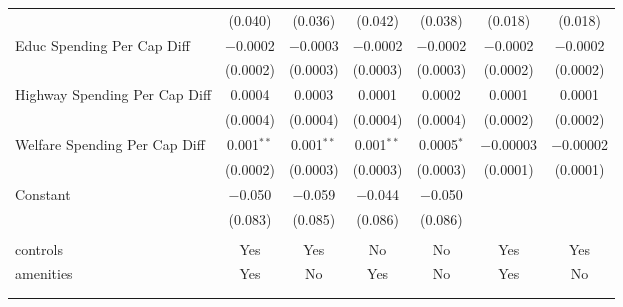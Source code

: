 \begin{table}[!htbp]
\begin{tabular}{@{\extracolsep{5pt}}lcccccc}
  & (0.040) & (0.036) & (0.042) & (0.038) & (0.018) & (0.018) \\ 
  Educ Spending Per Cap Diff & $-$0.0002 & $-$0.0003 & $-$0.0002 & $-$0.0002 & $-$0.0002 & $-$0.0002 \\ 
  & (0.0002) & (0.0003) & (0.0003) & (0.0003) & (0.0002) & (0.0002) \\ 
  Highway Spending Per Cap Diff & 0.0004 & 0.0003 & 0.0001 & 0.0002 & 0.0001 & 0.0001 \\ 
  & (0.0004) & (0.0004) & (0.0004) & (0.0004) & (0.0002) & (0.0002) \\ 
  Welfare Spending Per Cap Diff & 0.001$^{**}$ & 0.001$^{**}$ & 0.001$^{**}$ & 0.0005$^{*}$ & $-$0.00003 & $-$0.00002 \\ 
  & (0.0002) & (0.0003) & (0.0003) & (0.0003) & (0.0001) & (0.0001) \\ 
  Constant & $-$0.050 & $-$0.059 & $-$0.044 & $-$0.050 &  &  \\ 
  & (0.083) & (0.085) & (0.086) & (0.086) &  &  \\ 
 \hline \\[-1.8ex] 
controls & Yes & Yes & No & No & Yes & Yes \\ 
amenities & Yes & No & Yes & No & Yes & No \\ 
\hline \\[-1.8ex] 
\hline 
\hline \\[-1.8ex] 
\end{tabular} 
\end{table} 
